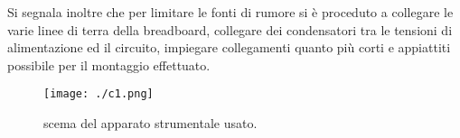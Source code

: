 	Si segnala inoltre che per limitare le fonti di rumore si è proceduto a
	collegare le varie linee di terra della breadboard,
	collegare dei condensatori tra le tensioni di alimentazione ed il circuito,
	impiegare collegamenti quanto più corti e appiattiti possibile per il montaggio effettuato.
	\begin{figure}[h]
		\centering
		\texttt{[image: ./c1.png]}
		\caption{scema del apparato strumentale usato.}
		\label{f:completo}
	\end{figure}